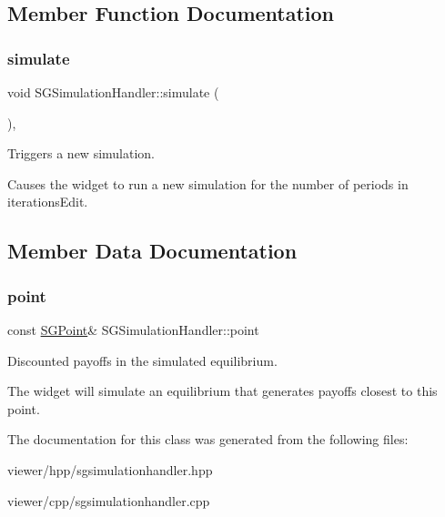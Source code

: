 \subsection{Member Function Documentation}
\mbox{\label{classSGSimulationHandler_a37b1504ddf71de0160cbac4f17788f8c}} 
\subsubsection{\texorpdfstring{simulate}{simulate}}
{\footnotesize\ttfamily void S\+G\+Simulation\+Handler\+::simulate (\begin{DoxyParamCaption}{ }\end{DoxyParamCaption})\hspace{0.3cm}{\ttfamily [private]}, {\ttfamily [slot]}}



Triggers a new simulation. 

Causes the widget to run a new simulation for the number of periods in iterations\+Edit. 

\subsection{Member Data Documentation}
\mbox{\label{classSGSimulationHandler_afe0ae445ab03e1413aecf88542f57e89}} 
\subsubsection{\texorpdfstring{point}{point}}
{\footnotesize\ttfamily const \hyperlink{classSGPoint}{S\+G\+Point}\& S\+G\+Simulation\+Handler\+::point\hspace{0.3cm}{\ttfamily [private]}}



Discounted payoffs in the simulated equilibrium. 

The widget will simulate an equilibrium that generates payoffs closest to this point. 

The documentation for this class was generated from the following files\+:\begin{DoxyCompactItemize}
\item 
viewer/hpp/sgsimulationhandler.\+hpp\item 
viewer/cpp/sgsimulationhandler.\+cpp\end{DoxyCompactItemize}
